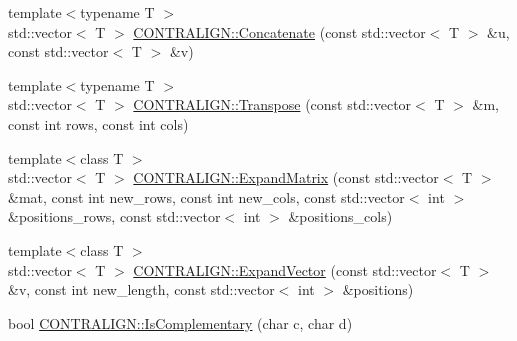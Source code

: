 \begin{DoxyCompactItemize}
\item 
{\footnotesize template$<$typename T $>$ }\\std\+::vector$<$ T $>$ \hyperlink{namespace_c_o_n_t_r_a_l_i_g_n_a1c2096f8a125b6a778f5fe8ef8c6b93a}{C\+O\+N\+T\+R\+A\+L\+I\+G\+N\+::\+Concatenate} (const std\+::vector$<$ T $>$ \&u, const std\+::vector$<$ T $>$ \&v)
\item 
{\footnotesize template$<$typename T $>$ }\\std\+::vector$<$ T $>$ \hyperlink{namespace_c_o_n_t_r_a_l_i_g_n_ad43313a97ba0a47e7858d11c88f9da36}{C\+O\+N\+T\+R\+A\+L\+I\+G\+N\+::\+Transpose} (const std\+::vector$<$ T $>$ \&m, const int rows, const int cols)
\item 
{\footnotesize template$<$class T $>$ }\\std\+::vector$<$ T $>$ \hyperlink{namespace_c_o_n_t_r_a_l_i_g_n_a53a2e031c10b47dedfcaab61f97c0c4b}{C\+O\+N\+T\+R\+A\+L\+I\+G\+N\+::\+Expand\+Matrix} (const std\+::vector$<$ T $>$ \&mat, const int new\+\_\+rows, const int new\+\_\+cols, const std\+::vector$<$ int $>$ \&positions\+\_\+rows, const std\+::vector$<$ int $>$ \&positions\+\_\+cols)
\item 
{\footnotesize template$<$class T $>$ }\\std\+::vector$<$ T $>$ \hyperlink{namespace_c_o_n_t_r_a_l_i_g_n_a565dbfcc2a892a5a9d55c1dafc1a77bf}{C\+O\+N\+T\+R\+A\+L\+I\+G\+N\+::\+Expand\+Vector} (const std\+::vector$<$ T $>$ \&v, const int new\+\_\+length, const std\+::vector$<$ int $>$ \&positions)
\item 
bool \hyperlink{namespace_c_o_n_t_r_a_l_i_g_n_adfeb25c8dd97c0d84c2b827e3d92e2e7}{C\+O\+N\+T\+R\+A\+L\+I\+G\+N\+::\+Is\+Complementary} (char c, char d)
\end{DoxyCompactItemize}


